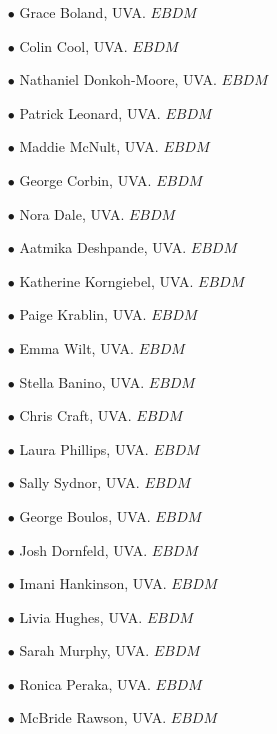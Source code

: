 \documentclass{article}[10pt]
\begin{document}
\begin{itemize}
\item [$\bullet$] Grace Boland, UVA. $EBDM$
\item [$\bullet$] Colin Cool, UVA. $EBDM$
\item [$\bullet$] Nathaniel Donkoh-Moore, UVA. $EBDM$
\item [$\bullet$] Patrick Leonard, UVA. $EBDM$
\item [$\bullet$] Maddie McNult, UVA. $EBDM$
\item [$\bullet$] George Corbin, UVA. $EBDM$
\item [$\bullet$] Nora Dale, UVA. $EBDM$
\item [$\bullet$] Aatmika Deshpande, UVA. $EBDM$
\item [$\bullet$] Katherine Korngiebel, UVA. $EBDM$
\item [$\bullet$] Paige Krablin, UVA. $EBDM$
\item [$\bullet$] Emma Wilt, UVA. $EBDM$
\item [$\bullet$] Stella Banino, UVA. $EBDM$
\item [$\bullet$] Chris Craft, UVA. $EBDM$
\item [$\bullet$] Laura Phillips, UVA. $EBDM$
\item [$\bullet$] Sally Sydnor, UVA. $EBDM$
\item [$\bullet$] George Boulos, UVA. $EBDM$
\item [$\bullet$] Josh Dornfeld, UVA. $EBDM$
\item [$\bullet$] Imani Hankinson, UVA. $EBDM$
\item [$\bullet$] Livia Hughes, UVA. $EBDM$
\item [$\bullet$] Sarah Murphy, UVA. $EBDM$
\item [$\bullet$] Ronica Peraka, UVA. $EBDM$
\item [$\bullet$] McBride Rawson, UVA. $EBDM$
\end{itemize}
\end{document}
